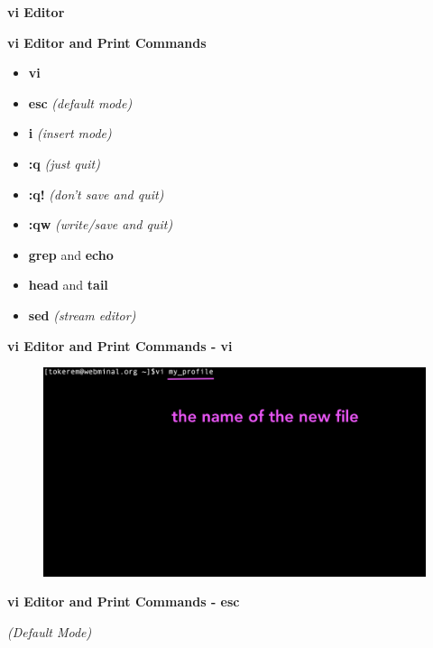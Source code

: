 \documentclass[ignorenonframetext,]{beamer}
\begin{document}
\begin{frame}[fragile]{\textbf{vi Editor}}

\begin{block}{\textbf{vi Editor and Print Commands}}

\begin{itemize}
\item
  {\textbf{vi}}
\item
  {\textbf{esc}} \emph{(default mode)}
\item
  {\textbf{i}} \emph{(insert mode)}
\item
  {\textbf{:q}} \emph{(just quit)}
\item
  {\textbf{:q!}} \emph{(don't save and quit)}
\item
  {\textbf{:qw}} \emph{(write/save and quit)}
\item
  {\textbf{grep}} and {\textbf{echo}}
\item
  {\textbf{head}} and {\textbf{tail}}
\item
  {\textbf{sed}} \emph{(stream editor)}
\end{itemize}

\end{block}

\begin{block}{\textbf{vi Editor and Print Commands - {\textbf{vi}}}}

\begin{figure}
\centering
\includegraphics{vi_0.png}
\caption{}
\end{figure}

\end{block}

\begin{block}{\textbf{vi Editor and Print Commands - {\textbf{esc}}}}

\emph{(Default Mode)}


\end{block}
\end{frame}
\end{document}
